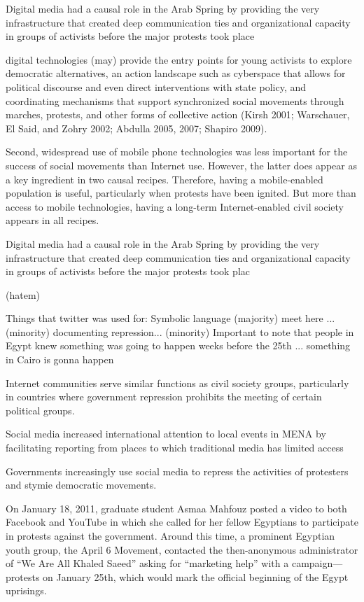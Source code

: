 	\citep{hussein_what_2013}
	
		Digital media had a causal role in the Arab Spring by providing the very infrastructure that created deep communication ties and organizational capacity in groups of activists before the major protests took place
		
		digital technologies (may) provide the entry points for young activists to explore democratic alternatives, an action landscape such as cyberspace that allows for political discourse and even direct interventions with state policy, and coordinating mechanisms that support synchronized social movements through marches, protests, and other forms of collective action (Kirsh 2001; Warschauer, El Said, and Zohry 2002; Abdulla 2005, 2007; Shapiro 2009).
		
		Second, widespread use of mobile phone technologies was less important for the success of social movements than Internet use. However, the latter does appear as a key ingredient in two causal recipes. Therefore, having a mobile-enabled population is useful, particularly when protests have been ignited. But more than access to mobile technologies, having a long-term Internet-enabled civil society appears in all recipes.
		
		Digital media had a causal role in the
		Arab Spring by providing the very infrastructure that created deep communication
		ties and organizational capacity in groups of activists before the major protests
		took plac
		
	(hatem) 
	
	
		Things that twitter was used for:
		    Symbolic language (majority)
			meet here ... (minority)
		    documenting repression... (minority)
		Important to note that people in Egypt knew something was going to happen weeks before the 25th ... something in Cairo is gonna happen 
	
	\cite{dewey_impact_2012}
		Internet communities serve similar functions as civil society groups, particularly in countries where government repression prohibits the meeting of certain political groups.
		
		Social media increased international attention to local events in MENA by facilitating reporting from places to which traditional media has limited access
		
		Governments increasingly use social media to repress the activities of protesters and stymie democratic movements.
		
		On January 18, 2011, graduate student Asmaa Mahfouz posted a video to both Facebook and YouTube in which she called for her fellow Egyptians to participate in protests against the government. Around this time, a prominent Egyptian youth group, the April 6 Movement, contacted the then-anonymous administrator of “We Are All Khaled Saeed” asking for “marketing help” with a campaign—protests on January 25th, which would mark the official beginning of the Egypt uprisings.
		 
